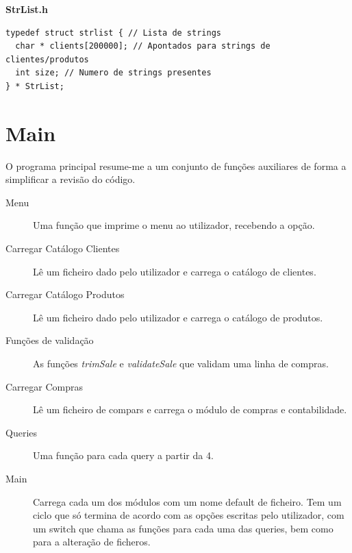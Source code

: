 \documentclass[10pt] {article}
\begin{document}
\textbf{StrList.h}
\begin{lstlisting}
typedef struct strlist { // Lista de strings
  char * clients[200000]; // Apontados para strings de clientes/produtos
  int size; // Numero de strings presentes
} * StrList;
\end{lstlisting}

\newpage
\section{Main}
\par O programa principal resume-me a um conjunto de funções auxiliares de forma a simplificar a revisão do código.

\begin{description}
  \item[Menu] Uma função que imprime o menu ao utilizador, recebendo a opção.

  \item[Carregar Catálogo Clientes] Lê um ficheiro dado pelo utilizador e carrega o catálogo de clientes.

  \item[Carregar Catálogo Produtos] Lê um ficheiro dado pelo utilizador e carrega o catálogo de produtos.

  \item[Funções de validação] As funções \emph{trimSale} e \emph{validateSale} que validam uma linha de compras.

  \item[Carregar Compras] Lê um ficheiro de compars e carrega o módulo de compras e contabilidade.

  \item[Queries] Uma função para cada query a partir da 4.

  \item[Main] Carrega cada um dos módulos com um nome default de ficheiro. Tem um ciclo que só termina de acordo com as opções escritas pelo utilizador, com um switch que chama as funções para cada uma das queries, bem como para a alteração de ficheros.

\end{description}

\newpage
\end{document}
